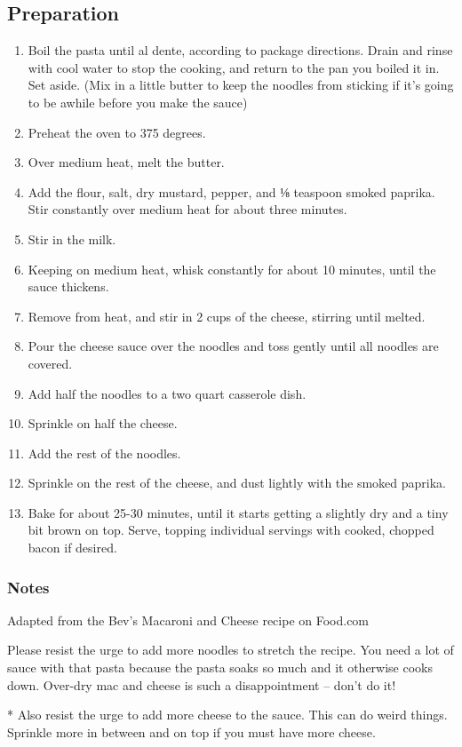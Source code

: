 \subsection{Preparation}
\begin{enumerate}
    \item Boil the pasta until al dente, according to package directions. Drain and rinse with cool water to stop the cooking, and return to the pan you boiled it in. Set aside. (Mix in a little butter to keep the noodles from sticking if it’s going to be awhile before you make the sauce)
    \item Preheat the oven to 375 degrees.
    \item Over medium heat, melt the butter.
    \item Add the flour, salt, dry mustard, pepper, and ⅛ teaspoon smoked paprika. Stir constantly over medium heat for about three minutes.
    \item Stir in the milk.
    \item Keeping on medium heat, whisk constantly for about 10 minutes, until the sauce thickens.
    \item Remove from heat, and stir in 2 cups of the cheese, stirring until melted.
    \item Pour the cheese sauce over the noodles and toss gently until all noodles are covered.
    \item Add half the noodles to a two quart casserole dish.
    \item Sprinkle on half the cheese.
    \item Add the rest of the noodles.
    \item Sprinkle on the rest of the cheese, and dust lightly with the smoked paprika.
    \item Bake for about 25-30 minutes, until it starts getting a slightly dry and a tiny bit brown on top. Serve, topping individual servings with cooked, chopped bacon if desired.
\end{enumerate}
 
\subsubsection{Notes}
Adapted from the Bev’s Macaroni and Cheese recipe on Food.com 

\noindent * Please resist the urge to add more noodles to stretch the recipe. You need a lot of sauce with that pasta because the pasta soaks so much and it otherwise cooks down. Over-dry mac and cheese is such a disappointment – don't do it! 

\noindent ** Also resist the urge to add more cheese to the sauce. This can do weird things. Sprinkle more in between and on top if you must have more cheese.
